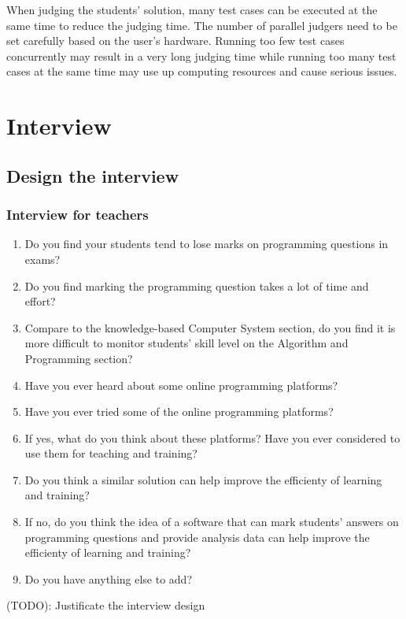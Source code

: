 \documentclass[a4paper]{report}
\begin{document}
When judging the students' solution, many test cases can be executed at the same time to reduce the judging time. The number of parallel judgers need to be set carefully based on the user's hardware. Running too few test cases concurrently may result in a very long judging time while running too many test cases at the same time may use up computing resources and cause serious issues.

\section{Interview}

\subsection{Design the interview}

\subsubsection{Interview for teachers}

\begin{enumerate}
    \item Do you find your students tend to lose marks on programming questions in exams?
    \item Do you find marking the programming question takes a lot of time and effort?
    \item Compare to the knowledge-based Computer System section, do you find it is more difficult to monitor students' skill level on the Algorithm and Programming section?
    \item Have you ever heard about some online programming platforms?
    \item Have you ever tried some of the online programming platforms?
    \item If yes, what do you think about these platforms? Have you ever considered to use them for teaching and training?
    \item Do you think a similar solution can help improve the efficienty of learning and training?
    \item If no, do you think the idea of a software that can mark students' answers on programming questions and provide analysis data can help improve the efficienty of learning and training?
    \item Do you have anything else to add?
\end{enumerate}

(TODO): Justificate the interview design
\end{document}
